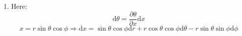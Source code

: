 \documentclass[12pt,a4]{article}
\newcommand{\e}{\mathrm{d}}
\begin{document}
\begin{enumerate}
\begin{align*}
    \end{align*}
    Now $\sqrt{g} = r^2 \sin \theta$ and $g^{\theta \theta} = -\frac{1}{r^2}$ and $g^{\phi\phi} = -\frac{1}{r^2 \sin^2\theta }$
    Therefore $\tensor{\epsilon}{^\theta ^\phi_t_r} = \sqrt{g} g^{\theta\theta} g^{\phi\phi} \sigma_{\theta\phi t r}$ and:
    \begin{align*}
      \e * F^{(4)} &= \e \left(Q \frac{Q}{r^2} \e t \wedge \e r\right)\\
                   &= 0 
    \end{align*}
  \item
    Here:
    \begin{equation*}
      \e \theta = \frac{\partial \theta }{ \partial x} \e x
    \end{equation*}
    \begin{equation*}
      x =  r \sin \theta \cos \phi \Rightarrow \e x = \sin \theta \cos \phi \e r + r \cos \theta \cos \phi \e \theta -  r \sin \theta \sin \phi \e \phi
    \end{equation*}
    
\end{enumerate}
\end{document}

